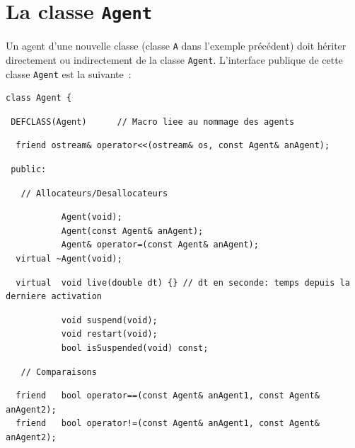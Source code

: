 \documentclass[12pt]{article}
\begin{document}
\newpage

\section{La classe {\tt Agent}}
\vspace{-0.2cm}
Un agent d'une nouvelle classe (classe {\tt A} dans l'exemple
pr\'ec\'edent) doit h\'eriter directement
ou indirectement de la classe {\tt Agent}.
L'interface publique de cette classe {\tt Agent} est la suivante~:

\vspace{-0.3cm}
\begin{footnotesize}
\label{Agent}
\begin{verbatim}
class Agent {
\end{verbatim}
\vspace{-0.5cm}
\begin{verbatim}
 DEFCLASS(Agent)      // Macro liee au nommage des agents
\end{verbatim}
\begin{verbatim}
  friend ostream& operator<<(ostream& os, const Agent& anAgent);
\end{verbatim}
\vspace{-0.6cm}
\begin{verbatim}
 public:
\end{verbatim}
\begin{verbatim}
   // Allocateurs/Desallocateurs
\end{verbatim}
\begin{verbatim}
           Agent(void);
           Agent(const Agent& anAgent);
           Agent& operator=(const Agent& anAgent);
  virtual ~Agent(void);
\end{verbatim}
\begin{verbatim}
  virtual  void live(double dt) {} // dt en seconde: temps depuis la derniere activation
\end{verbatim}
\begin{verbatim}
           void suspend(void);
           void restart(void);
           bool isSuspended(void) const;
\end{verbatim}
\begin{verbatim}
   // Comparaisons
\end{verbatim}
\begin{verbatim}
  friend   bool operator==(const Agent& anAgent1, const Agent& anAgent2);
  friend   bool operator!=(const Agent& anAgent1, const Agent& anAgent2);
\end{verbatim}
\begin{verbatim}

\end{verbatim}
\end{footnotesize}
\end{document}
